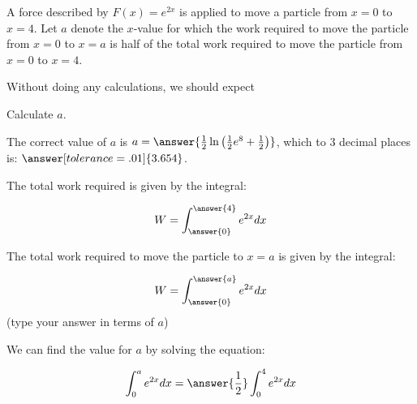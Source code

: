 \documentclass{ximera}
\author{Jim Talamo}
\begin{document}
\begin{exercise}

A force described by $F(x) = e^{2x}$ is applied to move a particle from $x=0$ to $x=4$.  Let $a$ denote the $x$-value for which the work required to move the particle from $x=0$ to $x=a$ is half of the total work required to move the particle from $x=0$ to $x=4$.

Without doing any calculations, we should expect
\begin{multipleChoice}
\end{multipleChoice}

\begin{exercise}
Calculate $a$.

The correct value of $a$ is $a=\answer{\frac{1}{2} \ln\left(\frac{1}{2}e^8+\frac{1}{2}\right)}$, which to 3 decimal places is: $\answer[tolerance=.01]{3.654}$.

\begin{hint}
The total work required is given by the integral:

\[
W = \int_{\answer{0}}^{\answer{4}} e^{2x} dx
\]

The total work required to move the particle to $x=a$ is given by the integral:

\[
W = \int_{\answer{0}}^{\answer{a}} e^{2x} dx
\]
(type your answer in terms of $a$)

\begin{question}
We can find the value for $a$ by solving the equation:

\[
\int_0^a e^{2x} dx = \answer{\frac{1}{2}} \int_0^4 e^{2x} dx
\]
\end{question}
\end{hint}

\end{exercise}
\end{exercise}
\end{document}
